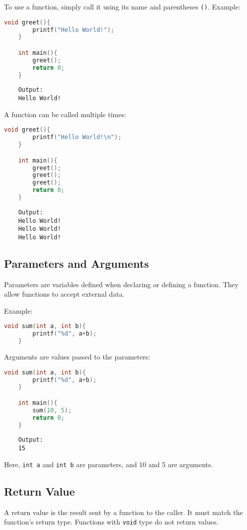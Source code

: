 To use a function, simply call it using its name and parentheses \verb|()|.  
Example:
\begin{lstlisting}[language=c]
	void greet(){
		printf("Hello World!");
	}

	int main(){
		greet();
		return 0;
	}
\end{lstlisting}
\begin{verbatim}
    Output:
    Hello World!
\end{verbatim}

A function can be called multiple times:
\begin{lstlisting}[language=c]
	void greet(){
		printf("Hello World!\n");
	}

	int main(){
		greet();
		greet();
		greet();
		return 0;
	}
\end{lstlisting}
\begin{verbatim}
	Output:
	Hello World!
	Hello World!
	Hello World!
\end{verbatim}

\subsection{Parameters and Arguments}

Parameters are variables defined when declaring or defining a function.  
They allow functions to accept external data.

Example:
\begin{lstlisting}[language=c]
	void sum(int a, int b){
		printf("%d", a+b);
	}
\end{lstlisting}

Arguments are values passed to the parameters:
\begin{lstlisting}[language=c]
	void sum(int a, int b){
		printf("%d", a+b);
	}

	int main(){
		sum(10, 5);
		return 0;
	}
\end{lstlisting}
\begin{verbatim}
	Output:
	15
\end{verbatim}

Here, \verb|int a| and \verb|int b| are parameters, and 10 and 5 are arguments.

\subsection{Return Value}

A return value is the result sent by a function to the caller.  
It must match the function’s return type.  
Functions with \verb|void| type do not return values.  

